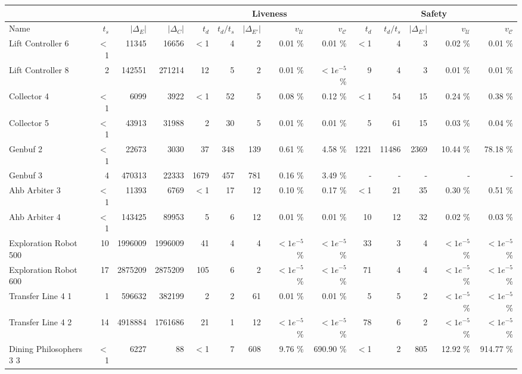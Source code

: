\begin{tabular}{|l|rrr|rr|rrr|rr|rrr|}
\cline{5-14}
   \multicolumn{4}{c|}{}&\multicolumn{5}{c|}{Liveness} & \multicolumn{5}{c|}{Safety}\\ \hline
Name & $t_{s}$ & $|\Delta_E|$ & $|\Delta_{C}|$ & $t_{d}$ & $t_{d}/t_{s}$ & $|\Delta_{E'}|$ & $v_{\mathcal{U}}$ & $v_{\mathcal{C}}$  & $t_{d}$ & $t_{d}/t_{s}$ & $|\Delta_{E'}|$ & $v_{\mathcal{U}}$ & $v_{\mathcal{C}}$ \\ 
\hline	
  Lift Controller 6 & $<$1 & 11345 & 16656 & $<$1 & 4 & 2 &  0.01 \% &    0.01 \% & $<$1 & 4 & 3 &  0.02 \% &    0.01 \% \\  
Lift Controller 8 & 2 & 142551 & 271214 & 12 & 5 & 2 &  0.01 \% & $<1e^{-5}$ \% & 9 & 4 & 3 &  0.01 \% &    0.01 \% \\ 
  Collector 4 & $<$1 & 6099 & 3922 & $<$1 & 52 & 5 &  0.08 \% &    0.12 \% & $<$1 & 54 & 15 &  0.24 \% &    0.38 \% \\ 
Collector 5 & $<$1 & 43913 & 31988 & 2 & 30 & 5 &  0.01 \% &    0.01 \% & 5 & 61 & 15 & 0.03 \% &    0.04 \% \\ 
  Genbuf 2 & $<$1 & 22673 & 3030 & 37 & 348 & 139 &  0.61 \% &    4.58 \% & 1221 & 11486 & 2369 & 10.44 \% &   78.18 \% \\ 
Genbuf 3 & 4 & 470313 & 22333 & 1679 & 457 & 781 &  0.16 \% &    3.49 \% & - & - & - &  - &    - \\ 
Ahb Arbiter 3 & $<$1 & 11393 & 6769 & $<$1 & 17 & 12 &  0.10 \% &    0.17 \% & $<$1 & 21 & 35 &  0.30 \% &    0.51 \% \\ 
  Ahb Arbiter 4 & $<$1 & 143425 & 89953 & 5 & 6 & 12 &  0.01 \% &    0.01 \% & 10 & 12 & 32 &  0.02 \% &    0.03 \% \\ 
  Exploration Robot 500 & 10 & 1996009 & 1996009 & 41 & 4 & 4 & $<1e^{-5}$ \% & $<1e^{-5}$ \% & 33 & 3 & 4 & $<1e^{-5}$ \% & $<1e^{-5}$ \% \\ 
Exploration Robot 600 & 17 & 2875209 & 2875209 & 105 & 6 & 2 & $<1e^{-5}$ \% & $<1e^{-5}$ \% & 71 & 4 & 4 & $<1e^{-5}$ \% & $<1e^{-5}$ \% \\ 
  Transfer Line 4 1 & 1 & 596632 & 382199 & 2 & 2 & 61 &  0.01 \% &    0.01 \% & 5 & 5 & 2 & $<1e^{-5}$ \% & $<1e^{-5}$ \% \\ 
Transfer Line 4 2 & 14 & 4918884 & 1761686 & 21 & 1 & 12 & $<1e^{-5}$ \% & $<1e^{-5}$ \% & 78 & 6 & 2 & $<1e^{-5}$ \% & $<1e^{-5}$ \% \\ 
  Dining Philosophers 3 3 & $<$1 & 6227 &  88 & $<$1 & 7 & 608 &  9.76 \% &  690.90 \% & $<$1 & 2 & 805 & 12.92 \% &  914.77 \% \\ 

\end{tabular}
